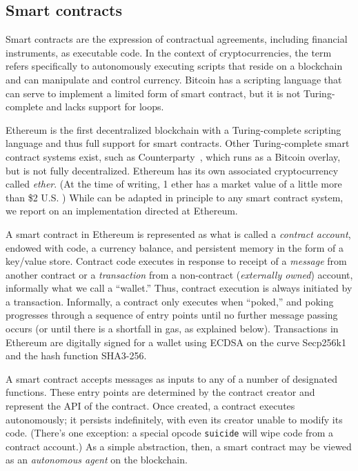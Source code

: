 \subsection{Smart contracts}

Smart contracts are the expression of contractual agreements, including financial instruments, as executable code. In the context of cryptocurrencies, the term refers specifically to autonomously executing scripts that reside on a blockchain and can manipulate and control currency. Bitcoin has a scripting language that can serve to implement a limited form of smart contract, but it is not Turing-complete and lacks support for loops. 

Ethereum is the first decentralized blockchain with a Turing-complete scripting language and thus full support for smart contracts. Other Turing-complete smart contract systems exist, such as Counterparty~\cite{}, which runs as a Bitcoin overlay, but is not fully decentralized. Ethereum has its own associated cryptocurrency called \emph{ether}. (At the time of writing, 1 ether has a market value of a little more than \$2 U.S. ) While \tc can be adapted in principle to any smart contract system, we report on an implementation directed at Ethereum.

A smart contract in Ethereum is represented as what is called a \emph{contract account}, endowed with code, a currency balance, and persistent memory in the form of a key/value store. Contract code executes in response to receipt of a \emph{message} from another contract or a \emph{transaction} from a non-contract (\emph{externally owned}) account, informally what we call a ``wallet.'' Thus, contract execution is always initiated by a transaction. Informally, a contract only executes when ``poked,'' and poking progresses through a sequence of entry points until no further message passing occurs (or until there is a shortfall in gas, as explained below). Transactions in Ethereum are digitally signed for a wallet using ECDSA on the curve Secp256k1 and the hash function SHA3-256. 

A smart contract accepts messages as inputs to any of a number of designated functions. These entry points are determined by the contract creator and represent the API of the contract. Once created, a contract executes autonomously; it persists indefinitely, with even its creator unable to modify its code. (There's one exception: a special opcode \texttt{suicide} will wipe code from a contract account.) As a simple abstraction, then, a smart contract may be viewed as an {\em autonomous agent} on the blockchain.  

